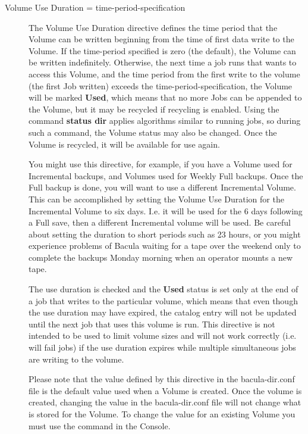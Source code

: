\begin{description}
\item [Volume Use Duration = \lt{}time-period-specification\gt{}]
   The Volume Use Duration directive defines the time period that the
   Volume can be written beginning from the time of first data write to the
   Volume.  If the time-period specified is zero (the default), the Volume
   can be written indefinitely.  Otherwise, the next time a job
   runs that wants to access this Volume, and the time period from the
   first write to the volume (the first Job written) exceeds the
   time-period-specification, the Volume will be marked {\bf Used}, which
   means that no more Jobs can be appended to the Volume, but it may be
   recycled if recycling is enabled. Using the command {\bf
   status dir} applies algorithms similar to running jobs, so
   during such a command, the Volume status may also be changed.
   Once the Volume is
   recycled, it will be available for use again.
   
   You might use this directive, for example, if you have a Volume used for
   Incremental backups, and Volumes used for Weekly Full backups.  Once the
   Full backup is done, you will want to use a different Incremental
   Volume.  This can be accomplished by setting the Volume Use Duration for
   the Incremental Volume to six days.  I.e.  it will be used for the 6
   days following a Full save, then a different Incremental volume will be
   used.  Be careful about setting the duration to short periods such as 23
   hours, or you might experience problems of Bacula waiting for a tape
   over the weekend only to complete the backups Monday morning when an
   operator mounts a new tape.
   
   The use duration is checked and the {\bf Used} status is set only at the
   end of a job that writes to the particular volume, which means that even
   though the use duration may have expired, the catalog entry will not be
   updated until the next job that uses this volume is run. This
   directive is not intended to be used to limit volume sizes
   and will not work correctly (i.e. will fail jobs) if the use
   duration expires while multiple simultaneous jobs are writing
   to the volume.
      
   Please note that the value defined by this directive in the  bacula-dir.conf
   file is the default value used when a Volume  is created. Once the volume is
   created, changing the value  in the bacula-dir.conf file will not change what
   is stored  for the Volume. To change the value for an existing Volume  you
   must use the 
    command in the Console.  


\end{description}
